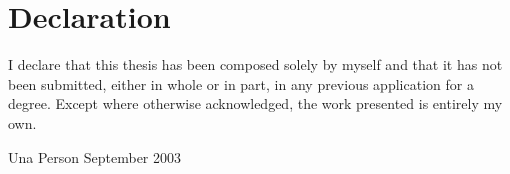 \chapter{Declaration}
\vspace*{2\baselineskip}
I declare that this thesis has been composed 
solely by myself and that it has not been submitted, either in whole or
in part, in any previous application for a degree.
Except where otherwise acknowledged, the work presented is entirely my
own.
\vspace{6\baselineskip}\\
\begin{flushright}
\hspace*{\fill}
Una Person
\newline
September 2003
\end{flushright}


\cleardoublepage
